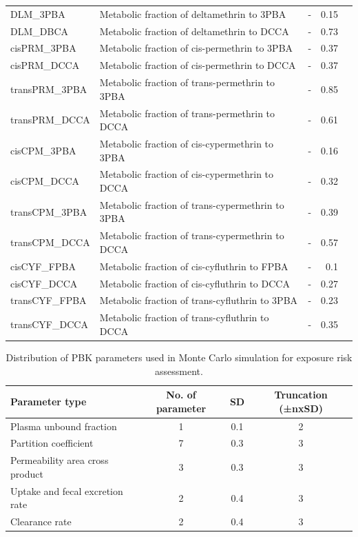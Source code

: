\begin{table}[h]
\begin{adjustwidth}{-4cm}{}
\begin{tabular}{lllrr}
DLM\_3PBA & Metabolic fraction of deltamethrin to 3PBA & - & 0.15 & \cite{quindroit2019estimating}\\
DLM\_DBCA & Metabolic fraction of deltamethrin to DCCA & - & 0.73 & \cite{quindroit2019estimating}\\
cisPRM\_3PBA & Metabolic fraction of cis-permethrin to 3PBA & - & 0.37 & \cite{quindroit2019estimating}\\
cisPRM\_DCCA & Metabolic fraction of cis-permethrin to DCCA & - & 0.37 & \cite{quindroit2019estimating}\\
transPRM\_3PBA & Metabolic fraction of trans-permethrin to 3PBA & - & 0.85 & \cite{quindroit2019estimating}\\
transPRM\_DCCA & Metabolic fraction of trans-permethrin to DCCA & - & 0.61 & \cite{quindroit2019estimating}\\
cisCPM\_3PBA & Metabolic fraction of cis-cypermethrin to 3PBA & - & 0.16 & \cite{quindroit2019estimating}\\
cisCPM\_DCCA & Metabolic fraction of cis-cypermethrin to DCCA & - & 0.32 & \cite{quindroit2019estimating}\\
transCPM\_3PBA & Metabolic fraction of trans-cypermethrin to 3PBA & - & 0.39 & \cite{quindroit2019estimating}\\
transCPM\_DCCA & Metabolic fraction of trans-cypermethrin to DCCA & - & 0.57 & \cite{quindroit2019estimating}\\
cisCYF\_FPBA & Metabolic fraction of cis-cyfluthrin to FPBA & - & 0.1 & \cite{quindroit2019estimating}\\
cisCYF\_DCCA & Metabolic fraction of cis-cyfluthrin to DCCA & - & 0.27 & \cite{quindroit2019estimating}\\
transCYF\_FPBA & Metabolic fraction of trans-cyfluthrin to 3PBA & - & 0.23 & \cite{quindroit2019estimating}\\
transCYF\_DCCA & Metabolic fraction of trans-cyfluthrin to DCCA & - & 0.35 & \cite{quindroit2019estimating}\\
\bottomrule
\end{tabular}
\end{adjustwidth}
\end{table}


\begin{table}
\begin{adjustwidth}{-4cm}{}
\caption{\label{tab:tabs4}Distribution of PBK parameters used in Monte Carlo simulation for exposure risk assessment.}
\begin{tabular}[t]{lccc}
\toprule
Parameter type & No. of parameter & SD & Truncation (±nxSD)\\
\midrule
Plasma unbound fraction & 1 & 0.1 & 2\\
Partition coefficient & 7 & 0.3 & 3\\
Permeability area cross product & 3 & 0.3 & 3\\
Uptake and fecal excretion rate & 2 & 0.4 & 3\\
Clearance rate & 2 & 0.4 & 3\\
\bottomrule
\end{tabular}
\end{adjustwidth}
\end{table}


